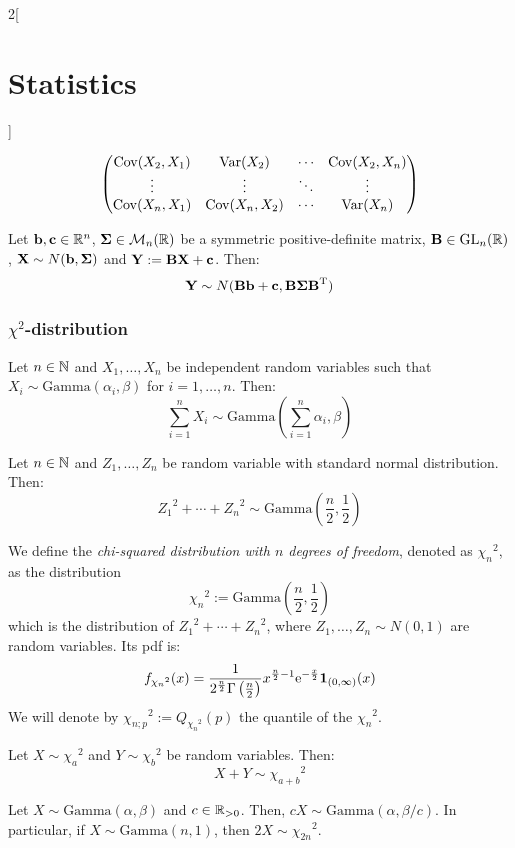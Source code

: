 \documentclass[../../../main.tex]{subfiles}
\begin{document}
\begin{multicols}{2}[\section{Statistics}]
\begin{proposition}
\begin{gather*}
\begin{pmatrix}
        \operatorname{Cov}(X_2,X_1) & \operatorname{Var}(X_2)     & \cdots & \operatorname{Cov}(X_2,X_n) \\
        \vdots        & \vdots        & \ddots & \vdots        \\
        \operatorname{Cov}(X_n,X_1) & \operatorname{Cov}(X_n,X_2) & \cdots & \operatorname{Var}(X_n)     \\
      \end{pmatrix}
    \end{gather*}
  \end{proposition}
  \begin{proposition}
    Let $\boldsymbol{\mathrm{b}},\boldsymbol{\mathrm{c}}\in\mathbb{R}^n$, $\boldsymbol{\mathrm{\Sigma}}\in\mathcal{M}_n(\mathbb{R})$ be a symmetric positive-definite matrix, $\boldsymbol{\mathrm{B}}\in\mathrm{GL}_n(\mathbb{R})$, $\boldsymbol{\mathrm{X}}\sim N(\boldsymbol{\mathrm{b}},\boldsymbol{\mathrm{\Sigma}})$ and $\boldsymbol{\mathrm{Y}}:=\boldsymbol{\mathrm{BX}}+\boldsymbol{\mathrm{c}}$. Then: $$\boldsymbol{\mathrm{Y}}\sim N(\boldsymbol{\mathrm{Bb}}+\boldsymbol{\mathrm{c}},\boldsymbol{\mathrm{B\Sigma}}{\boldsymbol{\mathrm{B}}}^{\mathrm{T}})$$
  \end{proposition}
  \subsubsection{\texorpdfstring{$\chi^2$}{chi2}-distribution}
  \begin{proposition}
    Let $n\in\mathbb{N}$ and $X_1,\ldots,X_n$ be independent random variables such that $X_i\sim \text{Gamma}(\alpha_i,\beta)$ for $i=1,\ldots,n$. Then: $$\sum_{i=1}^nX_i\sim\text{Gamma}\left(\sum_{i=1}^n\alpha_i,\beta\right)$$
  \end{proposition}
  \begin{corollary}
    Let $n\in\mathbb{N}$ and $Z_1,\ldots,Z_n$ be \iid random variable with standard normal distribution. Then: $${Z_1}^2+\cdots+{Z_n}^2\sim\text{Gamma}\left(\frac{n}{2},\frac{1}{2}\right)$$
  \end{corollary}
  \begin{definition}
    We define the \emph{chi-squared distribution with $n$ degrees of freedom}, denoted as ${\chi_n}^2$, as the distribution $${\chi_n}^2:=\text{Gamma}\left(\frac{n}{2},\frac{1}{2}\right)$$ which is the distribution of ${Z_1}^2+\cdots+{Z_n}^2$, where $Z_1,\ldots,Z_n\sim N(0,1)$ are \iid random variables. Its pdf is:
    $$f_{{\chi_n}^2}(x)=\frac{1}{2^\frac{n}{2}\Gamma\left(\frac{n}{2}\right)}x^{\frac{n}{2}-1}\mathrm{e}^{-\frac{x}{2}}\boldsymbol{\mathrm{1}}_{(0,\infty)}(x)$$
    We will denote by ${\chi_{n;p}}^2:=Q_{{\chi_n}^2}(p)$ the quantile of the ${\chi_n}^2$.
  \end{definition}
  \begin{proposition}
    Let $X\sim{\chi_a}^2$ and $Y\sim{\chi_b}^2$ be \iid random variables. Then: $$X+Y\sim{\chi_{a+b}}^2$$
  \end{proposition}
  \begin{proposition}
    Let $X\sim\text{Gamma}(\alpha,\beta)$ and $c\in\mathbb{R}_{>0}$. Then, $cX\sim\text{Gamma}(\alpha,\beta/c)$. In particular, if $X\sim\text{Gamma}(n,1)$, then $2X\sim {\chi_{2n}}^2$.
  \end{proposition}

\end{multicols}
\end{document}

